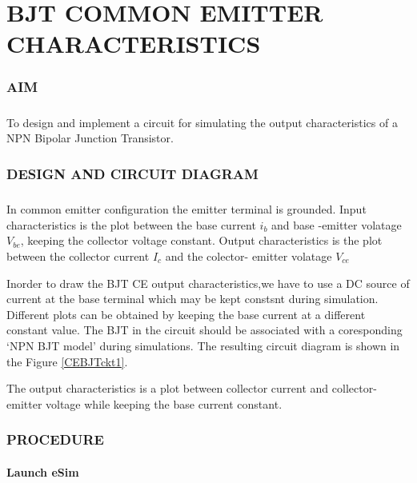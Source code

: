 \chapter{BJT COMMON EMITTER CHARACTERISTICS}

\subsection*{AIM}
\paragraph{}To design and implement a circuit for simulating the output characteristics of a NPN Bipolar Junction Transistor.

\subsection*{DESIGN AND CIRCUIT DIAGRAM}
\paragraph{}

In common emitter configuration the emitter terminal is grounded. Input characteristics is the plot between the base current $i_b$ and base -emitter volatage $V_{be}$, keeping the collector voltage constant.  Output characteristics is the plot between the collector current $I_c$ and the colector- emitter volatage $V_{ce}$

Inorder to draw the BJT CE output characteristics,we have to use a DC source of current at the base terminal which may be kept constsnt during simulation. Different plots can be obtained by keeping the base current at a different constant value. The BJT in the circuit should be associated with a coresponding `NPN BJT model' during  simulations. The resulting circuit diagram is shown in the Figure \ref{CEBJTckt1}.


The output characteristics is a plot between collector current and collector-emitter voltage while keeping the base current constant.

\subsection*{PROCEDURE}

\subsubsection{Launch eSim}

